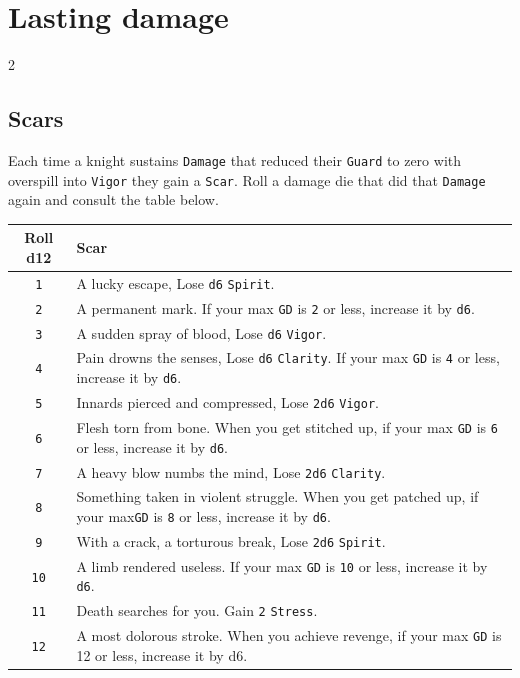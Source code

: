 \documentclass{osr-template/zine}
\begin{document}
\newpage
\section*{\centering \fontsize{35}{45}\selectfont Lasting damage}
\vspace*{0.4 cm}

\begin{multicols*}{2}

\subsection*{Scars} Each time a knight sustains \texttt{Damage} that reduced their \texttt{Guard} to zero with overspill into \texttt{Vigor} they gain a \texttt{Scar}.
Roll a damage die that did that \texttt{Damage} again and consult the table below.

\begin{center}
  \label{scars}
    \begin{tabular}{|c|p{5.7cm}|}
        \hline
        \textbf{Roll d12} & \textbf{Scar} \\
        \hline
        \texttt{1} & A lucky escape, Lose \texttt{d6} \texttt{Spirit}.\\
        \texttt{2} & A permanent mark. If your max \texttt{GD} is \texttt{2} or less, increase it by \texttt{d6}. \\
        \texttt{3} & A sudden spray of blood, Lose \texttt{d6} \texttt{Vigor}.\\
        \texttt{4} & Pain drowns the senses, Lose \texttt{d6} \texttt{Clarity}. If your max \texttt{GD} is \texttt{4} or less, increase it by \texttt{d6}.\\
        \texttt{5} & Innards pierced and compressed, Lose \texttt{2d6} \texttt{Vigor}.\\
        \texttt{6} & Flesh torn from bone. When you get stitched up, if your max \texttt{GD} is \texttt{6} or less, increase it by \texttt{d6}.\\
        \texttt{7} & A heavy blow numbs the mind, Lose \texttt{2d6} \texttt{Clarity}.\\
        \texttt{8} & Something taken in violent struggle. When you get patched up, if your max\texttt{GD} is \texttt{8} or less, increase it by \texttt{d6}.\\
        \texttt{9} & With a crack, a torturous break, Lose \texttt{2d6} \texttt{Spirit}.\\
        \texttt{10} & A limb rendered useless. If your max \texttt{GD} is \texttt{10} or less, increase it by \texttt{d6}. \\
        \texttt{11} & Death searches for you. Gain \texttt{2} \texttt{Stress}. \\
        \texttt{12} & A most dolorous stroke. When you achieve revenge, if your max \texttt{GD} is 12 or less, increase it by d6.\\
        \hline
    \end{tabular}
\end{center}


\end{multicols*}
\end{document}
